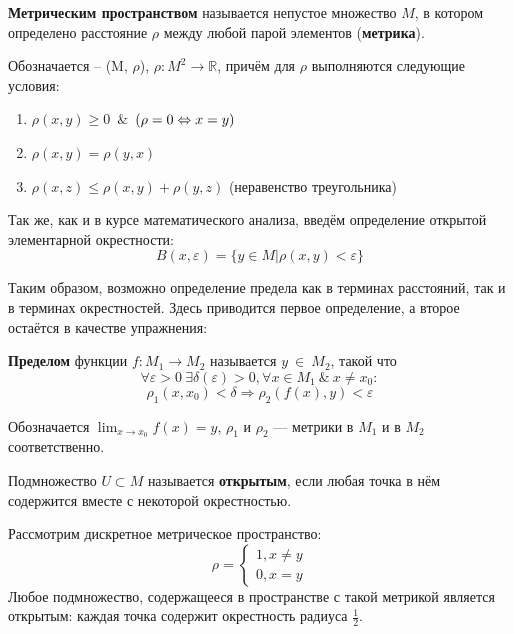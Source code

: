 \documentclass[12pt]{article}
\begin{document}
		\begin{defi}
			\textbf{Метрическим пространством} называется непустое множество $M$,
			в котором определено расстояние $\rho$ между любой парой элементов (\textbf{метрика}).

			Обозначается -- (M, $\rho$), $\rho : M^2 \rightarrow \mathbb{R}$, причём для $\rho$ выполняются
			следующие условия:
			\begin{enumerate}
				\item $\rho(x,y) \geq 0$~$\&$~$(\rho = 0 \Leftrightarrow x=y)$
				\item $\rho(x,y) = \rho(y,x)$
				\item $\rho(x,z) \leq \rho(x,y) + \rho(y,z)$ (неравенство треугольника)
			\end{enumerate}
		\end{defi}
	
		Так же, как и в курсе математического анализа, введём определение открытой элементарной окрестности:
		$$B(x, \varepsilon) = \{y \in M | \rho(x,y) < \varepsilon\}$$
	
		Таким образом, возможно определение предела как в терминах расстояний, так и в терминах окрестностей.
		Здесь приводится первое определение, а второе остаётся в качестве упражнения:
	
		\begin{defi}
			\textbf{Пределом} функции $f : M_1 \rightarrow M_2$ называется $y~\in~M_2$, такой что 
			$$\forall \varepsilon > 0 ~\exists 
			\delta(\varepsilon) > 0, \forall x \in M_1 ~\&~ x  \neq x_0 : $$
			$$\rho_1(x, x_0) < \delta \Rightarrow \rho_2(f(x), y) < \varepsilon$$
		\end{defi}
	
		Обозначается $\lim_{x \rightarrow x_0} f(x) = y$, $\rho_1$ и $\rho_2$ --- метрики в $M_1$ и в $M_2$
		соответственно.
	
		\begin{defi}
			Подмножество $U \subset M$ называется \textbf{открытым}, если любая точка в нём содержится вместе
			с некоторой окрестностью.
		\end{defi}
	
		\example Рассмотрим дискретное метрическое пространство:
		$$
			\rho = 
			\begin{cases}
				1, x \neq y \\
				0, x = y
			\end{cases}
		$$
		Любое подмножество, содержащееся в пространстве с такой метрикой является открытым: каждая точка
		содержит окрестность радиуса 
		$\frac{1}{2}$.
\end{document}
